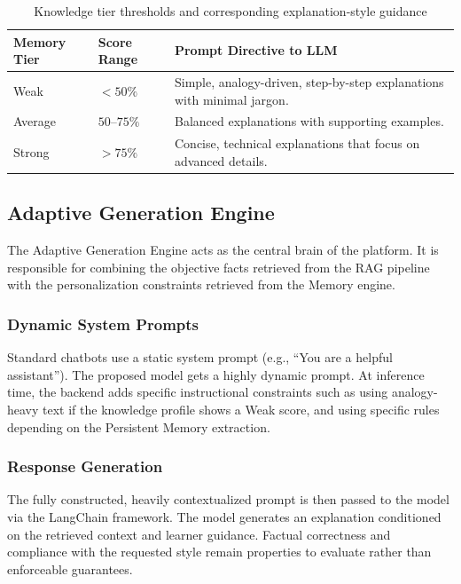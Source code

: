 \documentclass[11pt, a4paper, oneside]{report}
\begin{document}
\begin{table}[H]
  \centering
  \caption{Knowledge tier thresholds and corresponding explanation-style guidance}
  \label{tab:memory_tiers}
  \begin{tabular}{@{}p{2cm} p{2.5cm} p{8cm}@{}}
    \toprule
    \textbf{Memory Tier} & \textbf{Score Range} & \textbf{Prompt Directive to LLM} \\
    \midrule
    Weak    & $< 50\%$ & Simple, analogy-driven, step-by-step explanations with minimal jargon. \\[6pt]
    Average & $50$--$75\%$ & Balanced explanations with supporting examples. \\[6pt]
    Strong  & $> 75\%$ & Concise, technical explanations that focus on advanced details. \\
    \bottomrule
  \end{tabular}
\end{table}

\subsection{Adaptive Generation Engine}

The Adaptive Generation Engine acts as the central brain of the platform. It is responsible
for combining the objective facts retrieved from the RAG pipeline with the personalization
constraints retrieved from the Memory engine.

\subsubsection{Dynamic System Prompts}
Standard chatbots use a static system prompt (e.g., ``You are a helpful assistant''). The
proposed model gets a highly dynamic prompt. At inference time, the backend adds specific
instructional constraints such as using analogy-heavy text if the knowledge profile shows a
Weak score, and using specific rules depending on the Persistent Memory extraction.

\subsubsection{Response Generation}
The fully constructed, heavily contextualized prompt is then passed to the model via the
LangChain framework. The model generates an explanation conditioned on the retrieved context and learner guidance. Factual correctness and compliance with the requested style remain properties to evaluate rather than enforceable guarantees.
\end{document}
